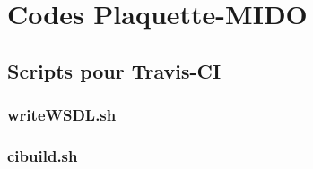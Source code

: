 \chapter*{Codes Plaquette-MIDO}

\makeatletter
\renewcommand{\thesection}{\@arabic\c@section}
\makeatother

\setcounter{section}{0}

\section*{Scripts pour Travis-CI}

\subsection*{writeWSDL.sh}


\vspace{1cm}

\subsection*{cibuild.sh}
\label{sec:cibuild}
